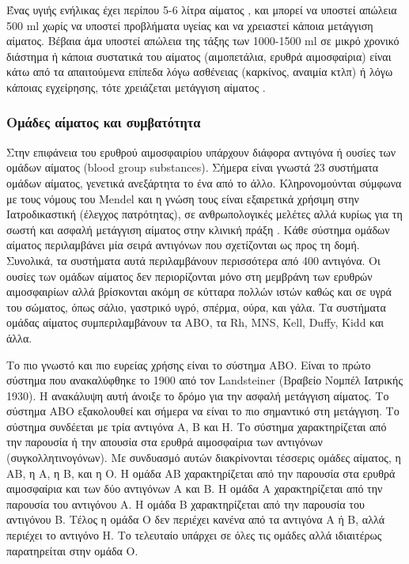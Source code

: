 	Ένας υγιής ενήλικας έχει περίπου 5-6 λίτρα αίματος \cite{bloodVolume}, και μπορεί να υποστεί απώλεια 500 ml χωρίς να υποστεί προβλήματα υγείας και να χρειαστεί κάποια μετάγγιση αίματος. Βέβαια άμα υποστεί απώλεια της τάξης των 1000-1500 ml σε μικρό χρονικό διάστημα ή κάποια συστατικά του αίματος (αιμοπετάλια, ερυθρά αιμοσφαίρια) είναι κάτω από τα απαιτούμενα επίπεδα λόγω ασθένειας (καρκίνος, αναιμία κτλπ) ή λόγω κάποιας εγχείρησης, τότε χρειάζεται μετάγγιση αίματος \cite{Stainsby01092000}.
		\subsubsection{Ομάδες αίματος και συμβατότητα}	
			Στην επιφάνεια του ερυθρού αιμοσφαιρίου υπάρχουν διάφορα αντιγόνα ή ουσίες των ομάδων αίματος (blood group substances). Σήμερα είναι γνωστά 23 συστήματα ομάδων αίματος, γενετικά ανεξάρτητα το ένα από το άλλο. Κληρονομούνται σύμφωνα με τους νόμους του Mendel και η γνώση τους είναι εξαιρετικά χρήσιμη στην Ιατροδικαστική (έλεγχος πατρότητας), σε ανθρωπολογικές μελέτες αλλά κυρίως για τη σωστή και ασφαλή μετάγγιση αίματος στην κλινική πράξη \cite{dawkins}. Κάθε σύστημα ομάδων αίματος περιλαμβάνει μία σειρά αντιγόνων που σχετίζονται ως προς τη δομή. Συνολικά, τα συστήματα αυτά περιλαμβάνουν περισσότερα από 400 αντιγόνα. Οι ουσίες των ομάδων αίματος δεν περιορίζονται μόνο στη μεμβράνη των ερυθρών αιμοσφαιρίων αλλά βρίσκονται ακόμη σε κύτταρα πολλών ιστών καθώς και σε υγρά του σώματος, όπως σάλιο, γαστρικό υγρό, σπέρμα, ούρα, και γάλα. Τα συστήματα ομάδας αίματος συμπεριλαμβάνουν τα ΑΒΟ, τα Rh, MNS, Kell, Duffy, Kidd και άλλα.
			
			Το πιο γνωστό και πιο ευρείας χρήσης είναι το σύστημα ΑΒΟ. Είναι το πρώτο σύστημα που ανακαλύφθηκε το 1900 από τον Landsteiner (Βραβείο Νομπέλ Ιατρικής 1930). Η ανακάλυψη αυτή άνοιξε το δρόμο για την ασφαλή μετάγγιση αίματος. Το σύστημα ΑΒΟ εξακολουθεί και σήμερα να είναι το πιο σημαντικό στη μετάγγιση. Το σύστημα συνδέεται με τρία αντιγόνα Α, Β και Η. Το σύστημα χαρακτηρίζεται από την παρουσία ή την απουσία στα ερυθρά αιμοσφαίρια των αντιγόνων (συγκολλητινογόνων). Με συνδυασμό αυτών διακρίνονται τέσσερις ομάδες αίματος, η ΑΒ, η Α, η Β, και η Ο. Η ομάδα ΑΒ χαρακτηρίζεται από την παρουσία στα ερυθρά αιμοσφαίρια και των δύο αντιγόνων Α και Β. Η ομάδα Α χαρακτηρίζεται από την παρουσία του αντιγόνου Α. Η ομάδα Β χαρακτηρίζεται από την παρουσία του αντιγόνου Β. Τέλος η ομάδα Ο δεν περιέχει κανένα από τα αντιγόνα Α ή Β, αλλά περιέχει το αντιγόνο Η. Το τελευταίο υπάρχει σε όλες τις ομάδες αλλά ιδιαιτέρως παρατηρείται στην ομάδα Ο.
			
